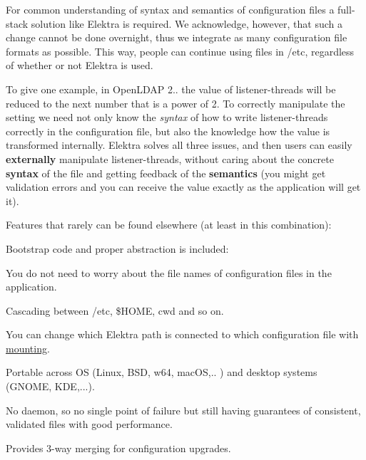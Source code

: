For common understanding of syntax and semantics of configuration files a full-\/stack solution like Elektra is required. We acknowledge, however, that such a change cannot be done overnight, thus we integrate as many configuration file formats as possible. This way, people can continue using files in {\ttfamily /etc}, regardless of whether or not Elektra is used.

To give one example, in Open\+L\+D\+AP 2.. the value of {\ttfamily listener-\/threads} will be reduced to the next number that is a power of 2. To correctly manipulate the setting we need not only know the {\itshape syntax} of how to write listener-\/threads correctly in the configuration file, but also the knowledge how the value is transformed internally. Elektra solves all three issues, and then users can easily {\bfseries externally} manipulate {\ttfamily listener-\/threads}, without caring about the concrete {\bfseries syntax} of the file and getting feedback of the {\bfseries semantics} (you might get validation errors and you can receive the value exactly as the application will get it).

Features that rarely can be found elsewhere (at least in this combination)\+:


\begin{DoxyItemize}
\item Bootstrap code and proper abstraction is included\+:
\begin{DoxyItemize}
\item You do not need to worry about the file names of configuration files in the application.
\item Cascading between {\ttfamily /etc}, {\ttfamily \$\+H\+O\+ME}, {\ttfamily cwd} and so on.
\item You can change which Elektra path is connected to which configuration file with \hyperlink{doc_help_elektra-mounting_md}{mounting}.
\item Portable across OS (Linux, B\+SD, w64, mac\+OS,.. ) and desktop systems (G\+N\+O\+ME, K\+DE,...).
\end{DoxyItemize}
\item No daemon, so no single point of failure but still having guarantees of consistent, validated files with good performance.
\item Provides 3-\/way merging for configuration upgrades.
\end{DoxyItemize}


